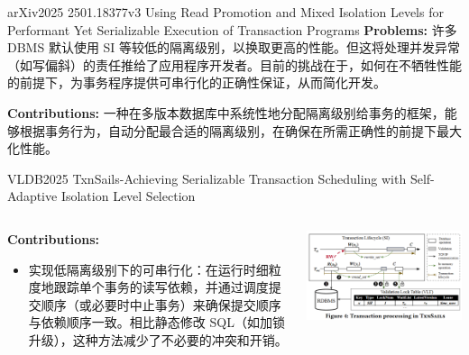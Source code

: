 \begin{frame}{arXiv2025 2501.18377v3 Using Read Promotion and Mixed Isolation Levels for Performant Yet Serializable Execution of Transaction Programs}
	\textbf{Problems: } 许多 DBMS 默认使用 SI 等较低的隔离级别，以换取更高的性能。但这将处理并发异常（如写偏斜）的责任推给了应用程序开发者。目前的挑战在于，如何在不牺牲性能的前提下，为事务程序提供可串行化的正确性保证，从而简化开发。


	\textbf{Contributions: }一种在多版本数据库中系统性地分配隔离级别给事务的框架，能够根据事务行为，自动分配最合适的隔离级别，在确保在所需正确性的前提下最大化性能。
\end{frame}

\begin{frame}{VLDB2025 TxnSails-Achieving Serializable Transaction Scheduling with Self-Adaptive Isolation Level Selection}
	\begin{columns}
		\begin{column}{0.5\textwidth}
			\textbf{Contributions: }
			\begin{itemize}
				\item 实现低隔离级别下的可串行化：在运行时细粒度地跟踪单个事务的读写依赖，并通过调度提交顺序（或必要时中止事务）来确保提交顺序与依赖顺序一致。相比静态修改 SQL（如加锁升级），这种方法减少了不必要的冲突和开销。
			\end{itemize}
		\end{column}
		\begin{column}{0.5\textwidth}
			\includegraphics[width=0.98\linewidth]{figs/TxnSails-txn-proc}
		\end{column}
	\end{columns}
\end{frame}


